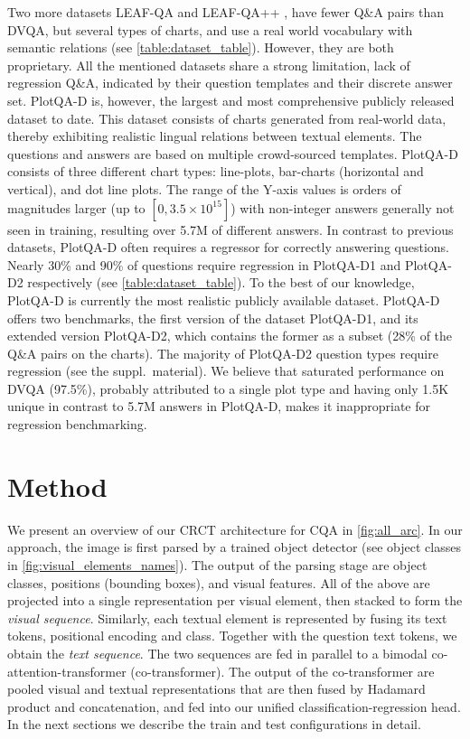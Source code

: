 \documentclass[runningheads]{llncs}
\newcommand\our[1][]{CRCT\xspace}
\begin{document}
Two more datasets LEAF-QA \cite{chaudhry2019leafqa} and LEAF-QA++ \cite{chartqa}, have fewer Q\&A pairs than DVQA, but several types of charts, and use a real world vocabulary with semantic relations (see \cref{table:dataset_table}).
However, they are both proprietary. All the mentioned datasets share a strong limitation, lack of regression Q\&A, indicated by their question templates and their discrete answer set. PlotQA-D \cite{plotqa} is, however, the largest and most comprehensive publicly released dataset to date. This dataset consists of charts generated from real-world data, thereby exhibiting realistic lingual relations between textual elements. The questions and answers are based on multiple crowd-sourced templates. PlotQA-D consists of three different chart types: line-plots, bar-charts (horizontal and vertical), and dot line plots. The range of the Y-axis values is orders of magnitudes larger (up to $[0,3.5 \times 10^{15}]$) with non-integer answers generally not seen in training, resulting over 5.7M of different answers. In contrast to previous datasets, PlotQA-D often requires a regressor for correctly answering questions. Nearly 30\% and 90\% of questions require regression in PlotQA-D1 and PlotQA-D2 respectively (see \cref{table:dataset_table}). To the best of our knowledge, PlotQA-D is currently the most realistic publicly available dataset.
PlotQA-D offers two benchmarks, the first version of the dataset PlotQA-D1, and its extended version PlotQA-D2, which contains the former as a subset (28\% of the Q\&A pairs on the charts). The majority of PlotQA-D2 question types require regression (see the suppl.~material). We believe that saturated performance on DVQA (97.5\%), probably attributed to a single plot type and having only 1.5K unique in contrast to 5.7M answers in PlotQA-D, makes it inappropriate for regression benchmarking.
%
 \section{Method}We present an overview of our \our architecture for CQA in \cref{fig:all_arc}. In our approach, the image is first parsed by a trained object detector (see object classes in \cref{fig:visual_elements_names}). The output of the parsing stage are object classes, positions (bounding boxes), and visual features. All of the above are projected into a single representation per visual element, then stacked to form the \emph{visual sequence}. Similarly, each textual element is represented by fusing its text tokens, positional encoding and class. Together with the question text tokens, we obtain the \emph{text sequence}.
The two sequences are fed in parallel to a bimodal co-attention-transformer (co-transformer). The output of the co-transformer are pooled visual and textual representations that are then fused by Hadamard product and concatenation, and fed into our unified classification-regression head. In the next sections we describe the train and test configurations in detail.
\end{document}
